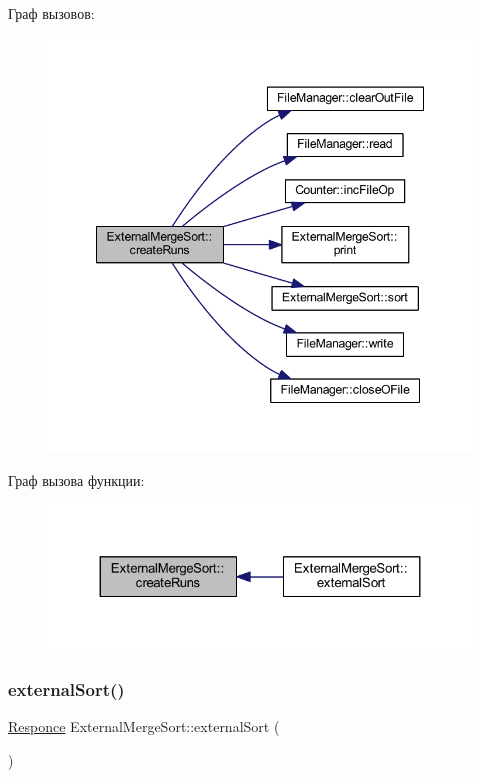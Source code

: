 Граф вызовов\+:\nopagebreak
\begin{figure}[H]
\begin{center}
\leavevmode
\includegraphics[width=348pt]{class_external_merge_sort_a54203f48d659003f5a75425354d4e262_cgraph}
\end{center}
\end{figure}
Граф вызова функции\+:\nopagebreak
\begin{figure}[H]
\begin{center}
\leavevmode
\includegraphics[width=324pt]{class_external_merge_sort_a54203f48d659003f5a75425354d4e262_icgraph}
\end{center}
\end{figure}
\hypertarget{class_external_merge_sort_aa0d80e41effe3a13c0d63b33e208918f}{}\label{class_external_merge_sort_aa0d80e41effe3a13c0d63b33e208918f} 
\subsubsection{\texorpdfstring{external\+Sort()}{externalSort()}}
{\footnotesize\ttfamily \hyperlink{_structures_8h_a9864d6ef28dd6e38416afac4426b3491}{Responce} External\+Merge\+Sort\+::external\+Sort (\begin{DoxyParamCaption}{ }\end{DoxyParamCaption})}

